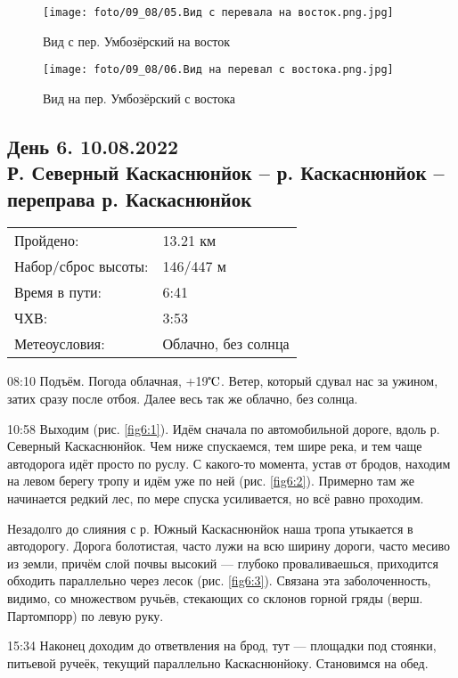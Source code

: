 \begin{figure}
    \centering
    \texttt{[image: foto/09\_08/05.Вид с перевала на восток.png.jpg]}
    \caption{Вид с пер. Умбозёрский на восток}
    \label{fig5:5}
\end{figure}

\begin{figure}
    \centering
    \texttt{[image: foto/09\_08/06.Вид на перевал с востока.png.jpg]}
    \caption{Вид на пер. Умбозёрский с востока}
    \label{fig5:6}
\end{figure}

\FloatBarrier

\subsection{День 6. 10.08.2022\\
Р. Северный Каскаснюнйок -- р. Каскаснюнйок -- переправа р. Каскаснюнйок}
\begin{tabular}{l p{12cm}}
\hline
Пройдено: & 13.21 км\\
Набор/сброс высоты: & 146/447 м\\
Время в пути: & 6:41\\
ЧХВ: & 3:53\\
Метеоусловия: & Облачно, без солнца\\
\hline
\end{tabular}

08:10 Подъём.
Погода облачная, +19$\tccentigrade$. Ветер, который сдувал нас за ужином, затих сразу после отбоя.
Далее весь так же облачно, без солнца.

10:58 Выходим (рис. \ref{fig6:1}).
Идём сначала по автомобильной дороге, вдоль р. Северный Каскаснюнйок. Чем ниже спускаемся, тем шире река,
и тем чаще автодорога идёт просто по руслу. С какого-то момента, устав от бродов, находим на левом берегу тропу
и идём уже по ней (рис. \ref{fig6:2}). Примерно там же начинается редкий лес, по мере спуска усиливается, но всё равно проходим.

Незадолго до слияния с р. Южный Каскаснюнйок наша тропа утыкается в автодорогу.
Дорога болотистая, часто лужи на всю ширину дороги, часто месиво из земли, причём слой почвы высокий --- глубоко проваливаешься,
приходится обходить параллельно через лесок (рис. \ref{fig6:3}). Связана эта заболоченность, видимо, со множеством ручьёв,
стекающих со склонов горной гряды (верш. Партомпорр) по левую руку.

15:34 Наконец доходим до ответвления на брод, тут --- площадки под стоянки, питьевой ручеёк, текущий параллельно Каскаснюнйоку.
Становимся на обед.

